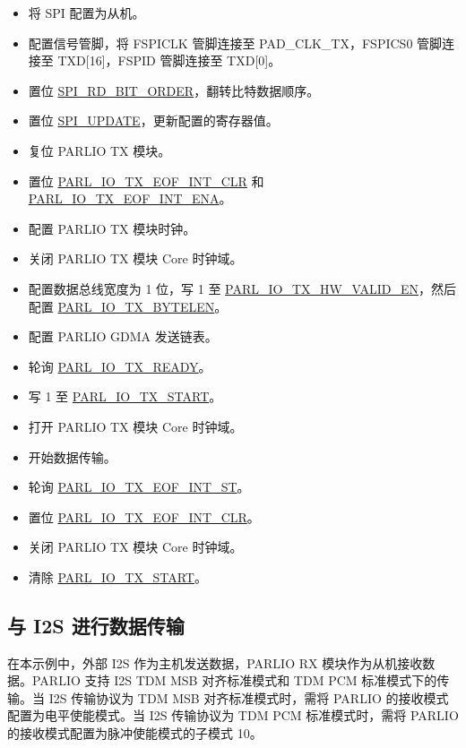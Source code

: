 \documentclass[main\_\_CN.tex]{subfiles}
\begin{document}
\begin{itemize}
\begin{itemize}
        \item 将 SPI 配置为从机。
        \item 配置信号管脚，将 FSPICLK 管脚连接至 PAD\_CLK\_TX，FSPICS0 管脚连接至 TXD[16]，FSPID 管脚连接至 TXD[0]。
        \item 置位 \hyperref[fielddesc:SPIRDBITORDER]{SPI\_RD\_BIT\_ORDER}，翻转比特数据顺序。
        \item 置位 \hyperref[fielddesc:SPIUPDATE]{SPI\_UPDATE}，更新配置的寄存器值。  
        \item 复位 PARLIO TX 模块。
        \item 置位 \hyperref[fielddesc:PARLIOTXEOFINTCLR]{PARL\_IO\_TX\_EOF\_INT\_CLR} 和 \hyperref[fielddesc:PARLIOTXEOFINTENA]{PARL\_IO\_TX\_EOF\_INT\_ENA}。
        \item 配置 PARLIO TX 模块时钟。
        \item 关闭 PARLIO TX 模块 Core 时钟域。
        \item 配置数据总线宽度为 1 位，写 1 至 \hyperref[fielddesc:PARLIOTXHWVALIDEN]{PARL\_IO\_TX\_HW\_VALID\_EN}，然后配置 \hyperref[fielddesc:PARLIOTXBYTELEN]{PARL\_IO\_TX\_BYTELEN}。
        \item 配置 PARLIO GDMA 发送链表。
        \item 轮询 \hyperref[fielddesc:PARLIOTXREADY]{PARL\_IO\_TX\_READY}。        
        \item 写 1 至 \hyperref[fielddesc:PARLIOTXSTART]{PARL\_IO\_TX\_START}。
        \item 打开 PARLIO TX 模块 Core 时钟域。
        \item 开始数据传输。
        \item 轮询 \hyperref[fielddesc:PARLIOTXEOFINTST]{PARL\_IO\_TX\_EOF\_INT\_ST}。
        \item 置位 \hyperref[fielddesc:PARLIOTXEOFINTCLR]{PARL\_IO\_TX\_EOF\_INT\_CLR}。
        \item 关闭 PARLIO TX 模块 Core 时钟域。
        \item 清除 \hyperref[fielddesc:PARLIOTXSTART]{PARL\_IO\_TX\_START}。  
    \end{itemize} 
\end{itemize}

\subsection{与 I2S 进行数据传输}

在本示例中，外部 I2S 作为主机发送数据，PARLIO RX 模块作为从机接收数据。PARLIO 支持 I2S TDM MSB 对齐标准模式和 TDM PCM 标准模式下的传输。当 I2S 传输协议为 TDM MSB 对齐标准模式时，需将 PARLIO 的接收模式配置为电平使能模式。当 I2S 传输协议为 TDM PCM 标准模式时，需将 PARLIO 的接收模式配置为脉冲使能模式的子模式 10。
\end{document}
